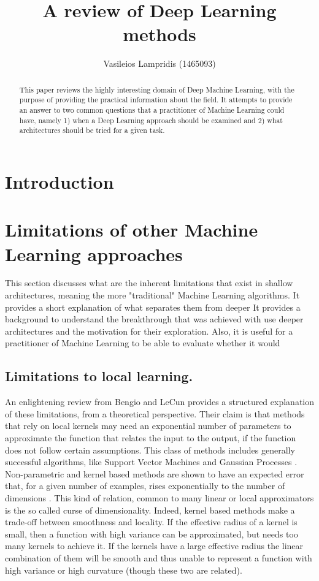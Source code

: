 \documentclass[a4paper]{report}
\author{Vasileios Lampridis	(1465093)}
\title{A review of Deep Learning methods}
\begin{document}
	
\tableofcontents
\listoffigures
\newpage

\maketitle

\begin{abstract}
This paper reviews the highly interesting domain of Deep Machine Learning, with the purpose of providing the practical information about the field. It attempts to provide an answer to two common questions that a practitioner of Machine Learning could have, namely 1) when a Deep Learning approach should be examined and 2) what architectures should be tried for a given task.
\end{abstract}

\section{Introduction}
\section{Limitations of other Machine Learning approaches}
	This section discusses what are the inherent limitations that exist in shallow architectures, meaning the more "traditional" Machine Learning algorithms. It provides a short explanation of what separates them from deeper It provides a background to understand the breakthrough that was achieved with use deeper architectures and the motivation for their exploration. Also, it is useful for a practitioner of Machine Learning to be able to evaluate whether it would 
	\subsection{Limitations to local learning.}
		An enlightening review from Bengio and LeCun \cite{Bengio2007} provides a structured explanation of these limitations, from a theoretical perspective. Their claim is that methods that rely on local kernels may need an exponential number of parameters to approximate the function that relates the input to the output, if the function does not follow certain assumptions. This class of methods includes generally successful algorithms, like Support Vector Machines \cite{Boser1992,Cortes1995} and Gaussian Processes \cite{Williams2006}.
		Non-parametric and kernel based methods are shown to have an expected error that, for a given number of examples, rises exponentially to the number of dimensions \cite{Hardle2004}. This kind of relation, common to many linear or local approximators is the so called curse of dimensionality.
		Indeed, kernel based methods make a trade-off between smoothness and locality. If the effective radius of a kernel is small, then a function with high variance can be approximated, but needs too many kernels to achieve it. If the kernels have a large effective radius the linear combination of them will be smooth and thus unable to represent a function with high variance or high curvature (though these two are related).
		
\end{document}
